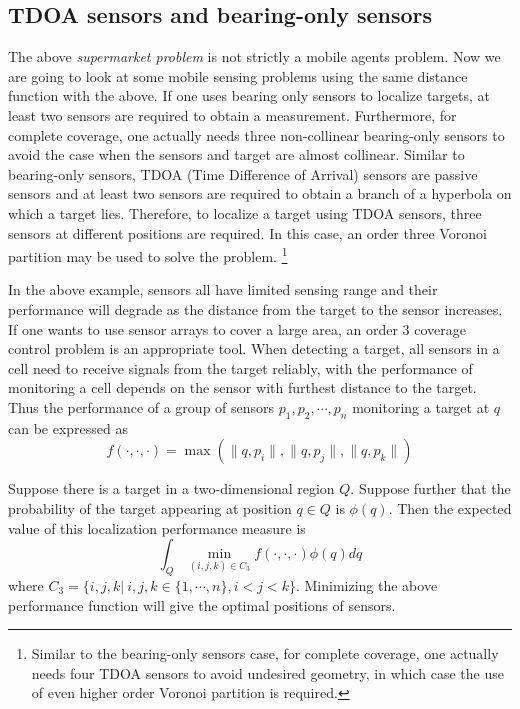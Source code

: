 \documentclass[letterpaper, 10 pt, conference]{ieeeconf}
\begin{document}
\subsection{TDOA sensors and bearing-only sensors}
The above \textit{supermarket problem} is not strictly a mobile agents problem. Now we are going to look at some mobile sensing problems using the same distance function with the above.
If one uses bearing only sensors to localize targets, at least two sensors are required to obtain a measurement. Furthermore, for complete coverage, one actually needs three non-collinear bearing-only sensors to avoid the case when the sensors and target are almost collinear.
Similar to bearing-only sensors, TDOA (Time Difference of Arrival) sensors are passive sensors and at least two sensors are required to obtain a branch of a hyperbola on which a target lies. Therefore, to localize a target using TDOA sensors, three sensors at different positions are required. In this case, an order three Voronoi partition may be used to solve the problem.
\footnote{Similar to the bearing-only sensors case, for complete coverage, one actually needs four TDOA sensors to avoid undesired geometry, in which case the use of even higher order Voronoi partition is required. }


In the above example, sensors all have limited sensing range and their performance will degrade as the distance from the target to the sensor increases. If one wants to use sensor arrays to cover a large area, an order 3 coverage control problem is an appropriate tool. When detecting a target, all sensors in a cell need to receive signals from the target reliably, with the performance of monitoring a cell depends on the sensor with furthest distance to the target.  Thus the performance of a group of sensors $p_1, p_2,\cdots,p_n$ monitoring a target at $q$ can be expressed as
$$f(\cdot,\cdot,\cdot)=\max(\|q,p_i\|,\|q,p_j\|,\|q,p_k\|)$$

Suppose there is a target in a two-dimensional region $Q$. Suppose further that the probability of the target appearing at position $q\in Q$ is $\phi(q)$. Then the expected value of this localization performance measure is
$$\int_Q \min_{(i,j,k)\in C_3} f(\cdot,\cdot,\cdot) \phi(q) dq$$
where $C_3=\{i,j,k|~i,j,k\in\{1,\cdots,n\},i < j<k\}$.
Minimizing the above performance function  will give the optimal positions of sensors.
\end{document}
